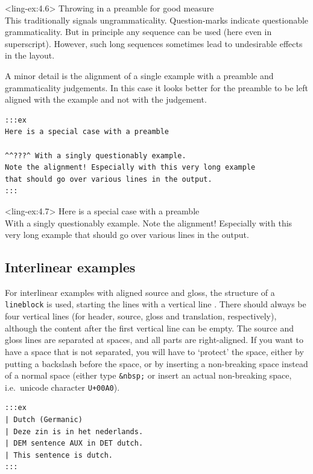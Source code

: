 \documentclass[
]{article}
\begin{document}
\pex[*=whynot?]<ling-ex:4.6> Throwing in a preamble for good measure\\
  \a \ljudge{*}This traditionally signals ungrammaticality.
  \a {}Question-marks indicate questionable grammaticality.
  \a {}But in principle any sequence can
be used (here even in superscript).
  \a However, such long sequences sometimes lead to undesirable effects
in the layout.
\xe

A minor detail is the alignment of a single example with a preamble and
grammaticality judgements. In this case it looks better for the preamble
to be left aligned with the example and not with the judgement.

\begin{verbatim}
:::ex
Here is a special case with a preamble

^^???^ With a singly questionably example.
Note the alignment! Especially with this very long example
that should go over various lines in the output.
:::
\end{verbatim}

\ex<ling-ex:4.7> Here is a special case with a preamble\\
  
   With a singly questionably example. Note
the alignment! Especially with this very long example that should go
over various lines in the output.
\xe

\hypertarget{interlinear-examples}{%
\subsection{Interlinear examples}\label{interlinear-examples}}

For interlinear examples with aligned source and gloss, the structure of
a \texttt{lineblock} is used, starting the lines with a vertical line
\texttt{\textbar{}}. There should always be four vertical lines (for
header, source, gloss and translation, respectively), although the
content after the first vertical line can be empty. The source and gloss
lines are separated at spaces, and all parts are right-aligned. If you
want to have a space that is not separated, you will have to `protect'
the space, either by putting a backslash before the space, or by
inserting a non-breaking space instead of a normal space (either type
\texttt{\&nbsp;} or insert an actual non-breaking space, i.e.~unicode
character \texttt{U+00A0}).

\begin{verbatim}
:::ex
| Dutch (Germanic)
| Deze zin is in het nederlands.
| DEM sentence AUX in DET dutch.
| This sentence is dutch.
:::
\end{verbatim}
\end{document}
